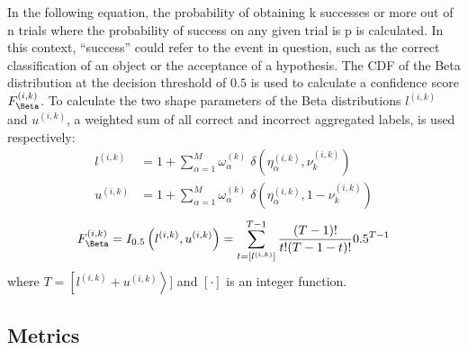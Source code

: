 In the following equation, the probability of obtaining k successes or more out of n trials where the probability of success on any given trial is p is calculated. In this context, ``success'' could refer to the event in question, such as the correct classification of an object or the acceptance of a hypothesis. The CDF of the Beta distribution at the decision threshold of $0.5 $ is used to calculate a confidence score $F_{\Beta}^{(i,k)}$. To calculate the two shape parameters of the Beta distributions $l^{(i,k)}$ and $u^{(i,k)}$, a weighted sum of all correct and incorrect aggregated labels, is used respectively:
\begin{equation}
    \begin{aligned}
        l^{(i,k)} &= 1 + \sum_{\alpha=1}^{M} \omega_{\alpha}^{(k)} \; \delta\left(\eta_{\alpha}^{(i,k)}, \nu_{k}^{(i,k)}\right) \\
        u^{(i,k)} &= 1 + \sum_{\alpha=1}^{M} \omega_{\alpha}^{(k)} \; \delta\left(\eta_{\alpha}^{(i,k)}, 1 - \nu_{k}^{(i,k)}\right)
    \end{aligned}
    \label{eq:crowd.Eq.14.beta_l_u}
\end{equation}
%
\begin{equation}
    F_{\Beta}^{(i,k)} =I_{0.5}\left(l^{(i,k)},u^{(i,k)}\right)=\sum_{t=[l^{(i,k)}]}^{T-1}\frac{(T-1)!}{t!(T-1-t)!}0.5^{T-1}
    \label{eq:crowd.Eq.15.confidence-score.Beta}
\end{equation}
where $T = \left [ l^{(i,k)} + u^{(i,k)} \right >] $ and $\left [ \cdot \right ] $ is an integer function.

\subsection{Metrics}

